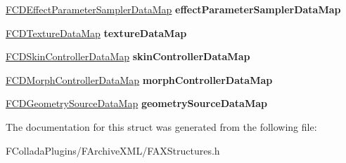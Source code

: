 \begin{DoxyCompactItemize}
\item 
\hypertarget{structFCDocumentLinkData_a05e47ee90ec25a4952943e5c6ad57d77}{
\hyperlink{classfm_1_1map}{FCDEffectParameterSamplerDataMap} {\bfseries effectParameterSamplerDataMap}}
\label{structFCDocumentLinkData_a05e47ee90ec25a4952943e5c6ad57d77}

\item 
\hypertarget{structFCDocumentLinkData_af5172944e078abc8a4db6d5c11036074}{
\hyperlink{classfm_1_1map}{FCDTextureDataMap} {\bfseries textureDataMap}}
\label{structFCDocumentLinkData_af5172944e078abc8a4db6d5c11036074}

\item 
\hypertarget{structFCDocumentLinkData_a12300b0abbdd584487a393ce5e2b04b3}{
\hyperlink{classfm_1_1map}{FCDSkinControllerDataMap} {\bfseries skinControllerDataMap}}
\label{structFCDocumentLinkData_a12300b0abbdd584487a393ce5e2b04b3}

\item 
\hypertarget{structFCDocumentLinkData_ac9da7b6c804f8a789cbd688d304dd2f8}{
\hyperlink{classfm_1_1map}{FCDMorphControllerDataMap} {\bfseries morphControllerDataMap}}
\label{structFCDocumentLinkData_ac9da7b6c804f8a789cbd688d304dd2f8}

\item 
\hypertarget{structFCDocumentLinkData_ad70664017dc2f1ba7328a2fbba76ce1d}{
\hyperlink{classfm_1_1map}{FCDGeometrySourceDataMap} {\bfseries geometrySourceDataMap}}
\label{structFCDocumentLinkData_ad70664017dc2f1ba7328a2fbba76ce1d}

\end{DoxyCompactItemize}


The documentation for this struct was generated from the following file:\begin{DoxyCompactItemize}
\item 
FColladaPlugins/FArchiveXML/FAXStructures.h\end{DoxyCompactItemize}
